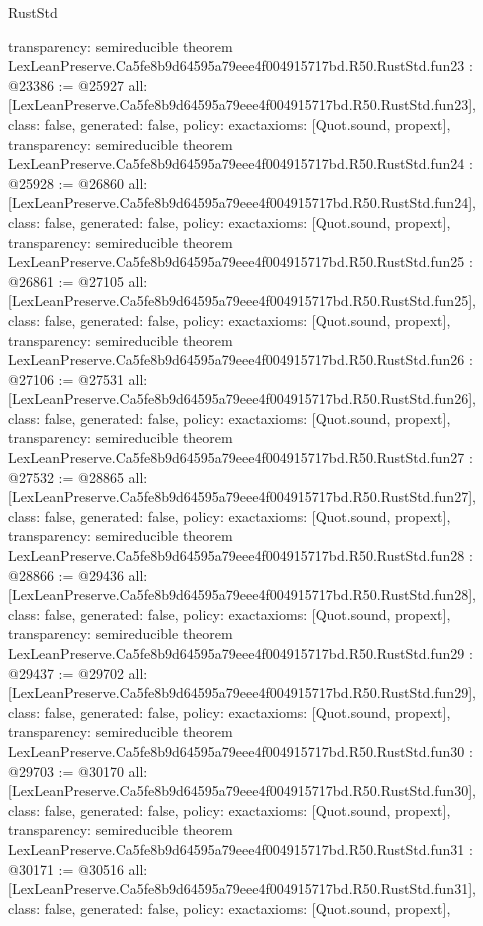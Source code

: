 \begin{lexlean}{RustStd}
\begin{coremodule}
{  transparency: semireducible
}
theorem LexLeanPreserve.Ca5fe8b9d64595a79eee4f004915717bd.R50.RustStd.fun23 : @23386 := @25927 {
  all: [LexLeanPreserve.Ca5fe8b9d64595a79eee4f004915717bd.R50.RustStd.fun23],
  class: false,
  generated: false,
  policy: exact{axioms: [Quot.sound, propext]},
  transparency: semireducible
}
theorem LexLeanPreserve.Ca5fe8b9d64595a79eee4f004915717bd.R50.RustStd.fun24 : @25928 := @26860 {
  all: [LexLeanPreserve.Ca5fe8b9d64595a79eee4f004915717bd.R50.RustStd.fun24],
  class: false,
  generated: false,
  policy: exact{axioms: [Quot.sound, propext]},
  transparency: semireducible
}
theorem LexLeanPreserve.Ca5fe8b9d64595a79eee4f004915717bd.R50.RustStd.fun25 : @26861 := @27105 {
  all: [LexLeanPreserve.Ca5fe8b9d64595a79eee4f004915717bd.R50.RustStd.fun25],
  class: false,
  generated: false,
  policy: exact{axioms: [Quot.sound, propext]},
  transparency: semireducible
}
theorem LexLeanPreserve.Ca5fe8b9d64595a79eee4f004915717bd.R50.RustStd.fun26 : @27106 := @27531 {
  all: [LexLeanPreserve.Ca5fe8b9d64595a79eee4f004915717bd.R50.RustStd.fun26],
  class: false,
  generated: false,
  policy: exact{axioms: [Quot.sound, propext]},
  transparency: semireducible
}
theorem LexLeanPreserve.Ca5fe8b9d64595a79eee4f004915717bd.R50.RustStd.fun27 : @27532 := @28865 {
  all: [LexLeanPreserve.Ca5fe8b9d64595a79eee4f004915717bd.R50.RustStd.fun27],
  class: false,
  generated: false,
  policy: exact{axioms: [Quot.sound, propext]},
  transparency: semireducible
}
theorem LexLeanPreserve.Ca5fe8b9d64595a79eee4f004915717bd.R50.RustStd.fun28 : @28866 := @29436 {
  all: [LexLeanPreserve.Ca5fe8b9d64595a79eee4f004915717bd.R50.RustStd.fun28],
  class: false,
  generated: false,
  policy: exact{axioms: [Quot.sound, propext]},
  transparency: semireducible
}
theorem LexLeanPreserve.Ca5fe8b9d64595a79eee4f004915717bd.R50.RustStd.fun29 : @29437 := @29702 {
  all: [LexLeanPreserve.Ca5fe8b9d64595a79eee4f004915717bd.R50.RustStd.fun29],
  class: false,
  generated: false,
  policy: exact{axioms: [Quot.sound, propext]},
  transparency: semireducible
}
theorem LexLeanPreserve.Ca5fe8b9d64595a79eee4f004915717bd.R50.RustStd.fun30 : @29703 := @30170 {
  all: [LexLeanPreserve.Ca5fe8b9d64595a79eee4f004915717bd.R50.RustStd.fun30],
  class: false,
  generated: false,
  policy: exact{axioms: [Quot.sound, propext]},
  transparency: semireducible
}
theorem LexLeanPreserve.Ca5fe8b9d64595a79eee4f004915717bd.R50.RustStd.fun31 : @30171 := @30516 {
  all: [LexLeanPreserve.Ca5fe8b9d64595a79eee4f004915717bd.R50.RustStd.fun31],
  class: false,
  generated: false,
  policy: exact{axioms: [Quot.sound, propext]},
}
\end{coremodule}
\end{lexlean}
